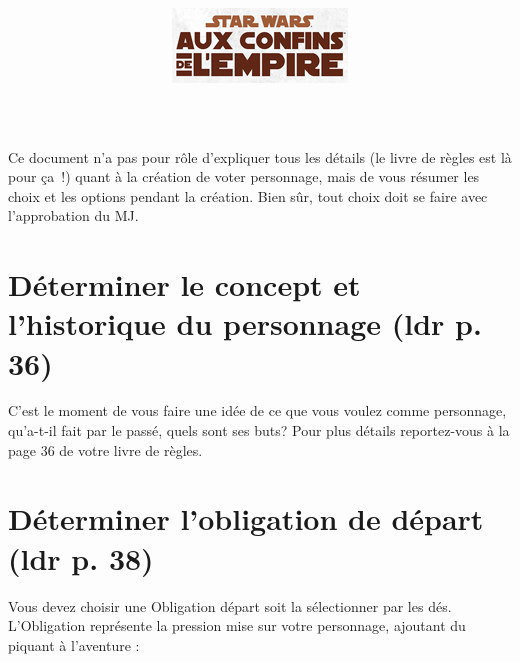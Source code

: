 \documentclass[twoside]{article}
\begin{document}
\title{\vspace{8cm}{\Huge Star Wars aux confins de l'empire} \\ \vspace{2cm} \includegraphics{../img/logo}}

\date{}



\maketitle
\vspace{4cm}
Ce document n’a pas pour rôle d'expliquer tous les détails (le livre de règles est là pour ça !) quant à la création de voter personnage, mais de vous résumer les choix et les options pendant la création. Bien sûr, tout choix doit se faire avec l’approbation du MJ.
\clearpage
\tableofcontents
\clearpage

\section{Déterminer le concept et l'historique du personnage (ldr p. 36)}

C'est le moment de vous faire une idée de ce que vous voulez comme personnage, qu'a-t-il fait par le passé, quels sont ses buts? Pour plus détails reportez-vous à la page 36 de votre livre de règles.

\section{Déterminer l'obligation de départ (ldr p. 38)}
Vous devez choisir une Obligation départ soit la sélectionner par les dés. L'Obligation représente la pression mise sur votre personnage, ajoutant du piquant à l'aventure :
\end{document}
